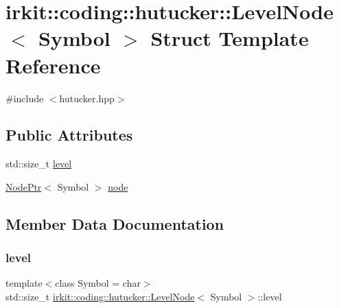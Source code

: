 \hypertarget{structirkit_1_1coding_1_1hutucker_1_1LevelNode}{}\section{irkit\+:\+:coding\+:\+:hutucker\+:\+:Level\+Node$<$ Symbol $>$ Struct Template Reference}
\label{structirkit_1_1coding_1_1hutucker_1_1LevelNode}


{\ttfamily \#include $<$hutucker.\+hpp$>$}

\subsection*{Public Attributes}
\begin{DoxyCompactItemize}
\item 
std\+::size\+\_\+t \mbox{\hyperlink{structirkit_1_1coding_1_1hutucker_1_1LevelNode_ab5c027467f6ffc22d3f2326aae260bb6}{level}}
\item 
\mbox{\hyperlink{namespaceirkit_1_1coding_1_1hutucker_a3fd5bcbd5c6d608f75e0afbb7f171899}{Node\+Ptr}}$<$ Symbol $>$ \mbox{\hyperlink{structirkit_1_1coding_1_1hutucker_1_1LevelNode_af3cce80927ab2ee4a546db1c860944e6}{node}}
\end{DoxyCompactItemize}


\subsection{Member Data Documentation}
\mbox{\label{structirkit_1_1coding_1_1hutucker_1_1LevelNode_ab5c027467f6ffc22d3f2326aae260bb6}} 
\subsubsection{\texorpdfstring{level}{level}}
{\footnotesize\ttfamily template$<$class Symbol = char$>$ \\
std\+::size\+\_\+t \mbox{\hyperlink{structirkit_1_1coding_1_1hutucker_1_1LevelNode}{irkit\+::coding\+::hutucker\+::\+Level\+Node}}$<$ Symbol $>$\+::level}

\mbox{\label{structirkit_1_1coding_1_1hutucker_1_1LevelNode_af3cce80927ab2ee4a546db1c860944e6}} 
